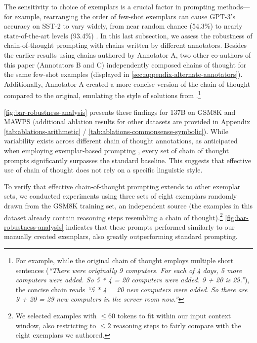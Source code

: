 The sensitivity to choice of exemplars is a crucial factor in prompting methods—for example, rearranging the order of few-shot exemplars can cause GPT-3’s accuracy on SST-2 to vary widely, from near random chance (54.3\%) to nearly state-of-the-art levels (93.4\%) \citep{zhao2021calibrate}. In this last subsection, we assess the robustness of chain-of-thought prompting with chains written by different annotators. Besides the earlier results using chains authored by Annotator A, two other co-authors of this paper (Annotators B and C) independently composed chains of thought for the same few-shot examples (displayed in \cref{sec:appendix-alternate-annotators}). Additionally, Annotator A created a more concise version of the chain of thought compared to the original, emulating the style of solutions from \citet{cobbe2021training}.\footnote{For example, while the original chain of thought employs multiple short sentences (\textit{“There were originally 9 computers. For each of 4 days, 5 more computers were added. So 5 * 4 = 20 computers were added. 9 + 20 is 29.”}), the concise chain reads \textit{“5 * 4 = 20 new computers were added. So there are 9 + 20 = 29 new computers in the server room now.”}}

\cref{fig:bar-robustness-analysis} presents these findings for \lamda{} 137B on GSM8K and MAWPS (additional ablation results for other datasets are provided in Appendix \cref{tab:ablations-arithmetic} / \cref{tab:ablations-commonsense-symbolic}). While variability exists across different chain of thought annotations, as anticipated when employing exemplar-based prompting \citep{le-scao-rush-2021-many,reynolds2021prompt,zhao2021calibrate}, every set of chain of thought prompts significantly surpasses the standard baseline. This suggests that effective use of chain of thought does not rely on a specific linguistic style.

To verify that effective chain-of-thought prompting extends to other exemplar sets, we conducted experiments using three sets of eight exemplars randomly drawn from the GSM8K training set, an independent source (the examples in this dataset already contain reasoning steps resembling a chain of thought).\footnote{We selected examples with $\leq 60$ tokens to fit within our input context window, also restricting to $\leq 2$ reasoning steps to fairly compare with the eight exemplars we authored.} \cref{fig:bar-robustness-analysis} indicates that these prompts performed similarly to our manually created exemplars, also greatly outperforming standard prompting.

